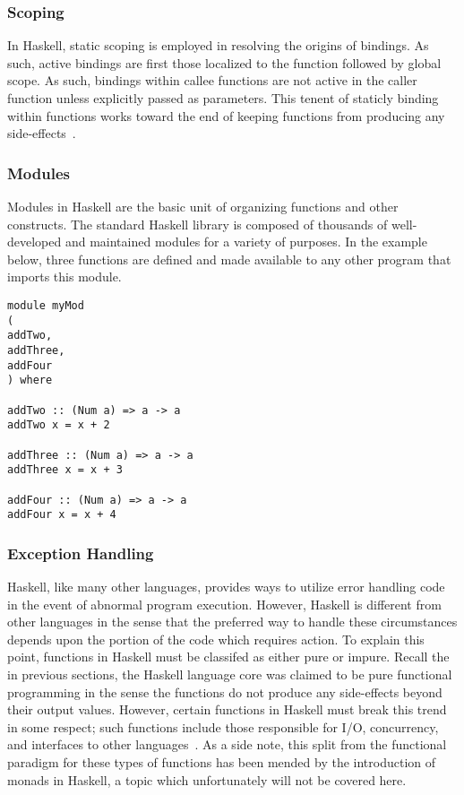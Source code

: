 \documentclass[titlepage,12pt]{article}
\begin{document}
\subsubsection{Scoping}
In Haskell, static scoping is employed in resolving the origins of bindings.  As such, active bindings are first those localized
to the function followed by global scope.  As such, bindings within callee functions are not active in the caller function
unless explicitly passed as parameters.  This tenent of staticly binding within functions
works toward the end of keeping functions from producing any side-effects~\cite{haskell-scope}.

\subsubsection{Modules}

Modules in Haskell are the basic unit of organizing functions and other constructs.  The standard Haskell library
is composed of thousands of well-developed and maintained modules for a variety of purposes.  In the example below,
three functions are defined and made available to any other program that imports this module.

\begin{verbatim}
module myMod 
( 
addTwo,
addThree,
addFour
) where

addTwo :: (Num a) => a -> a
addTwo x = x + 2

addThree :: (Num a) => a -> a
addThree x = x + 3

addFour :: (Num a) => a -> a
addFour x = x + 4
\end{verbatim}
\subsubsection{Exception Handling}

Haskell, like many other languages, provides ways to utilize error handling code
in the event of abnormal program execution.  However, Haskell is
different from other languages in the sense that the preferred way to handle
these circumstances depends upon the portion of the code which requires action.
To explain this point, functions in Haskell must be classifed as either pure
or impure.  Recall the in previous sections, the Haskell language core was
claimed to be pure functional programming in the sense the functions do
not produce any side-effects beyond their output values.  However, certain
functions in Haskell must break this trend in some respect; such functions include
those responsible for I/O, concurrency, and interfaces to other languages~\cite{haskell-awkward-squad}.
As a side note, this split from the functional paradigm for these types of functions has
been mended by the introduction of monads in Haskell, a topic which unfortunately will not be covered here.
\end{document}
